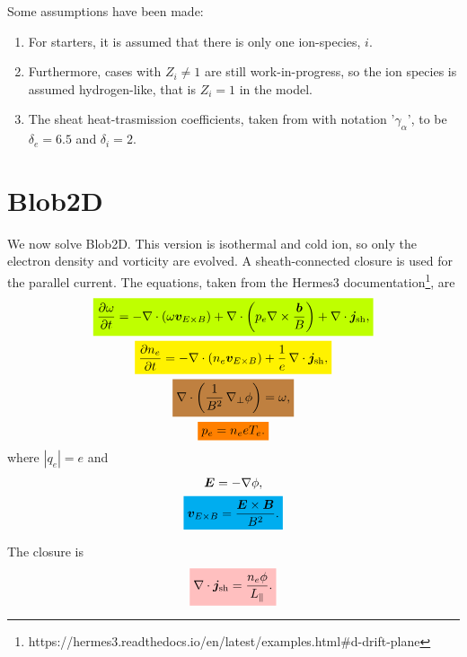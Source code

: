 \documentclass{article}
\newcommand{\mathcolorbox}[2]{\colorbox{#1}{$\displaystyle #2$}}
\begin{document}
Some assumptions have been made:
%
\begin{enumerate}
    \item For starters, it is assumed that there is only one ion-species, $i$.
    \item Furthermore, cases with $Z_i \ne 1$ are still work-in-progress, so the ion species is assumed hydrogen-like, that is $Z_i = 1$ in the model.
    \item The sheat heat-trasmission coefficients, taken from \cite[§2.8]{Stangeby_Plasma_2000} with notation '$\gamma_\alpha$', to be $\delta_e = 6.5$ and $\delta_i = 2$.
\end{enumerate}

\newpage

\section{Blob2D}

We now solve Blob2D. This version is isothermal and cold ion, so only the electron density and vorticity are evolved. A sheath-connected closure is used for the parallel current. The equations, taken from the Hermes3 documentation\footnote{https://hermes3.readthedocs.io/en/latest/examples.html\#d-drift-plane}, are
%
\begin{gather}
    \mathcolorbox{lime}{ \frac{\partial\omega}{\partial t} = - \nabla \cdot (\omega \bm{v}_{E \times B}) + \nabla \cdot \left( p_e \nabla \times \frac{\bm{b}}{B} \right) + \nabla \cdot \bm{j}_\text{sh} , } \label{eq:vorticity} \\
    \mathcolorbox{yellow}{ \frac{\partial n_e}{\partial t} = - \nabla \cdot (n_e \bm{v}_{E \times B}) + \frac{1}{e} \, \nabla \cdot \bm{j}_\text{sh} , } \label{eq:density} \\
    \mathcolorbox{brown}{ \nabla \cdot \left( \frac{1}{B^2} \, \nabla_\perp \phi \right) = \omega , } \label{eq:potential} \\
    \mathcolorbox{orange}{ p_e = n_e eT_e . } \label{eq:pressure}
\end{gather}
%
where $|q_e| = e$ and
%
\begin{gather}
    \bm{E} = - \nabla \phi , \\
    \mathcolorbox{cyan}{ \bm{v}_{E \times B} = \frac{\bm{E} \times\bm{B}}{B^2} . }
\end{gather}

The closure is
%
\begin{equation}
    \mathcolorbox{pink}{ \nabla \cdot \bm{j}_\text{sh} = \frac{n_e \phi}{L_\parallel} . } \label{eq:sheath}
\end{equation}
\end{document}
